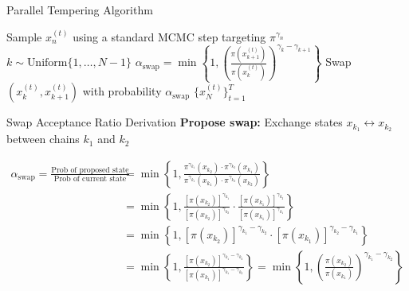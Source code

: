 \documentclass[aspectratio=169]{beamer}
\begin{document}
\begin{frame}{Parallel Tempering Algorithm}
	\begin{algorithm}[H]
		\caption{Parallel Tempering MCMC}
		\begin{algorithmic}[1]
			\STATE Sample $x_n^{(t)}$ using a standard MCMC step targeting $\pi^{\gamma_n}$
			\ENDFOR
			\STATE $k \sim \text{Uniform}\{1, \ldots, N-1\}$
			\STATE $\alpha_{\text{swap}} = \min\left\{1, \left(\frac{\pi(x_{k+1}^{(t)})}{\pi(x_k^{(t)})}\right)^{\gamma_k - \gamma_{k+1}}\right\}$
			\STATE Swap $(x_k^{(t)}, x_{k+1}^{(t)})$ with probability $\alpha_{\text{swap}}$
			\ENDFOR
			\RETURN $\{x_N^{(t)}\}_{t=1}^T$
		\end{algorithmic}
	\end{algorithm}
\end{frame}

\begin{frame}{Swap Acceptance Ratio Derivation}
	\textbf{Propose swap:} Exchange states $x_{k_1} \leftrightarrow x_{k_2}$ between chains $k_1$ and $k_2$

	\begin{align*}
		\alpha_{\text{swap}} = \frac{\text{Prob of proposed state}}{\text{Prob of current state}} & = \min\left\{1, \frac{\pi^{\gamma_{k_1}}(x_{k_2}) \cdot \pi^{\gamma_{k_2}}(x_{k_1})}{\pi^{\gamma_{k_1}}(x_{k_1}) \cdot \pi^{\gamma_{k_2}}(x_{k_2})}\right\}           \\
		                     & = \min\left\{1, \frac{[\pi(x_{k_2})]^{\gamma_{k_1}}}{[\pi(x_{k_2})]^{\gamma_{k_2}}} \cdot \frac{[\pi(x_{k_1})]^{\gamma_{k_2}}}{[\pi(x_{k_1})]^{\gamma_{k_1}}}\right\} \\
		                     & = \min\left\{1, [\pi(x_{k_2})]^{\gamma_{k_1} - \gamma_{k_2}} \cdot [\pi(x_{k_1})]^{\gamma_{k_2} - \gamma_{k_1}}\right\}                                               \\
		                     & = \min\left\{1, \frac{[\pi(x_{k_2})]^{\gamma_{k_1} - \gamma_{k_2}}}{[\pi(x_{k_1})]^{\gamma_{k_1} - \gamma_{k_2}}}\right\}
		= \min\left\{1, \left(\frac{\pi(x_{k_2})}{\pi(x_{k_1})}\right) ^{\gamma_{k_1} - \gamma_{k_2}}    \right\}
	\end{align*}
\end{frame}
\end{document}
